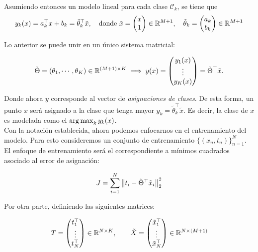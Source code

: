Asumiendo entonces un modelo lineal para cada clase $\mathcal{C}_k$, se tiene que
\begin{equation}
	y_k(x) = a_k^\top x + b_k = \tilde{\theta}_k^\top\tilde{x}, \quad \text{donde } \tilde{x} = \left( \begin{matrix} x\\ 1 \end{matrix}\right)\in\mathbb{R}^{M+1} ,\quad
  \tilde{\theta}_k = \left( \begin{matrix} a_k\\ b_k \end{matrix}\right)\in\mathbb{R}^{M+1}
\end{equation}

Lo anterior se puede unir en un único sistema matricial:

\begin{equation}
\tilde{\Theta} = \left(\theta_1,\cdots,\theta_K\right)\in\mathbb{R}^{(M+1)\times K} \implies  y(x) = \left( \begin{matrix}y_1(x) \\\vdots \\ y_K(x) \end{matrix}\right) = \tilde{\Theta}^\top \tilde{x}.
  \end{equation}
  


Donde ahora $y$ corresponde al vector de \emph{asignaciones de clases}. De esta forma, un punto $x$ será asignado a la clase que tenga mayor $y_k=\tilde{\theta}_k^\top \tilde{x}$. Es  decir, la clase de $x$ es modelada como  el  $\operatorname*{arg\,max}_k y_k(x)$.\\

Con la notación establecida, ahora podemos enfocarnos en el entrenamiento del modelo.  Para esto consideremos un conjunto de entrenamiento $\{(x_n,t_n)\}_{n=1}^N$. El enfoque de entrenamiento será el correspondiente a mínimos cuadrados asociado al error de asignación:

\begin{equation}
	J = \sum_{i=1}^N \left\lVert t_i - \tilde{\Theta}^\top\tilde{x}_i\right\rVert_2^2
\end{equation}

Por otra parte, definiendo las siguientes matrices:

\begin{equation}
	T = \left(\begin{matrix}
		t_1^\top\\
		\vdots\\
		t_N^\top
	\end{matrix}\right)\in\mathbb{R}^{N\times K},\qquad
	\tilde{X} = \left(\begin{matrix}
		\tilde{x}_1^\top\\
		\vdots\\
		\tilde{x}_N^\top
	\end{matrix}\right)\in\mathbb{R}^{N\times (M+1)}
\end{equation}

